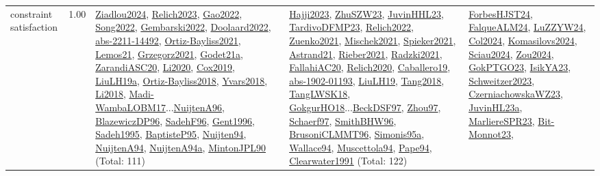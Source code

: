 {\begin{longtable}{p{3cm}r>{\raggedright\arraybackslash}p{6cm}>{\raggedright\arraybackslash}p{6cm}>{\raggedright\arraybackslash}p{8cm}}
\index{constraint satisfaction}\index{CP!constraint satisfaction}constraint satisfaction &  1.00 & \hyperref[detail:Ziadlou2024]{Ziadlou2024}, \hyperref[detail:Relich2023]{Relich2023}, \hyperref[detail:Gao2022]{Gao2022}, \hyperref[detail:Song2022]{Song2022}, \hyperref[detail:Gembarski2022]{Gembarski2022}, \hyperref[detail:Doolaard2022]{Doolaard2022}, \hyperref[detail:abs-2211-14492]{abs-2211-14492}, \hyperref[detail:Ortiz-Bayliss2021]{Ortiz-Bayliss2021}, \hyperref[detail:Lemos21]{Lemos21}, \hyperref[detail:Grzegorz2021]{Grzegorz2021}, \hyperref[detail:Godet21a]{Godet21a}, \hyperref[detail:ZarandiASC20]{ZarandiASC20}, \hyperref[detail:Li2020]{Li2020}, \hyperref[detail:Cox2019]{Cox2019}, \hyperref[detail:LiuLH19a]{LiuLH19a}, \hyperref[detail:Ortiz-Bayliss2018]{Ortiz-Bayliss2018}, \hyperref[detail:Yvars2018]{Yvars2018}, \hyperref[detail:Li2018]{Li2018}, \hyperref[detail:Madi-WambaLOBM17]{Madi-WambaLOBM17}...\hyperref[detail:NuijtenA96]{NuijtenA96}, \hyperref[detail:BlazewiczDP96]{BlazewiczDP96}, \hyperref[detail:SadehF96]{SadehF96}, \hyperref[detail:Gent1996]{Gent1996}, \hyperref[detail:Sadeh1995]{Sadeh1995}, \hyperref[detail:BaptisteP95]{BaptisteP95}, \hyperref[detail:Nuijten94]{Nuijten94}, \hyperref[detail:NuijtenA94]{NuijtenA94}, \hyperref[detail:NuijtenA94a]{NuijtenA94a}, \hyperref[detail:MintonJPL90]{MintonJPL90} (Total: 111) & \hyperref[detail:Hajji2023]{Hajji2023}, \hyperref[detail:ZhuSZW23]{ZhuSZW23}, \hyperref[detail:JuvinHHL23]{JuvinHHL23}, \hyperref[detail:TardivoDFMP23]{TardivoDFMP23}, \hyperref[detail:Relich2022]{Relich2022}, \hyperref[detail:Zuenko2021]{Zuenko2021}, \hyperref[detail:Mischek2021]{Mischek2021}, \hyperref[detail:Spieker2021]{Spieker2021}, \hyperref[detail:Astrand21]{Astrand21}, \hyperref[detail:Rieber2021]{Rieber2021}, \hyperref[detail:Radzki2021]{Radzki2021}, \hyperref[detail:FallahiAC20]{FallahiAC20}, \hyperref[detail:Relich2020]{Relich2020}, \hyperref[detail:Caballero19]{Caballero19}, \hyperref[detail:abs-1902-01193]{abs-1902-01193}, \hyperref[detail:LiuLH19]{LiuLH19}, \hyperref[detail:Tang2018]{Tang2018}, \hyperref[detail:TangLWSK18]{TangLWSK18}, \hyperref[detail:GokgurHO18]{GokgurHO18}...\hyperref[detail:BeckDSF97]{BeckDSF97}, \hyperref[detail:Zhou97]{Zhou97}, \hyperref[detail:Schaerf97]{Schaerf97}, \hyperref[detail:SmithBHW96]{SmithBHW96}, \hyperref[detail:BrusoniCLMMT96]{BrusoniCLMMT96}, \hyperref[detail:Simonis95a]{Simonis95a}, \hyperref[detail:Wallace94]{Wallace94}, \hyperref[detail:Muscettola94]{Muscettola94}, \hyperref[detail:Pape94]{Pape94}, \hyperref[detail:Clearwater1991]{Clearwater1991} (Total: 122) & \hyperref[detail:ForbesHJST24]{ForbesHJST24}, \hyperref[detail:FalqueALM24]{FalqueALM24}, \hyperref[detail:LuZZYW24]{LuZZYW24}, \hyperref[detail:Col2024]{Col2024}, \hyperref[detail:Komasilovs2024]{Komasilovs2024}, \hyperref[detail:Sciau2024]{Sciau2024}, \hyperref[detail:Zou2024]{Zou2024}, \hyperref[detail:GokPTGO23]{GokPTGO23}, \hyperref[detail:IsikYA23]{IsikYA23}, \hyperref[detail:Schweitzer2023]{Schweitzer2023}, \hyperref[detail:CzerniachowskaWZ23]{CzerniachowskaWZ23}, \hyperref[detail:JuvinHL23a]{JuvinHL23a}, \hyperref[detail:MarliereSPR23]{MarliereSPR23}, \hyperref[detail:Bit-Monnot23]{Bit-Monnot23}, 
\end{longtable}}
